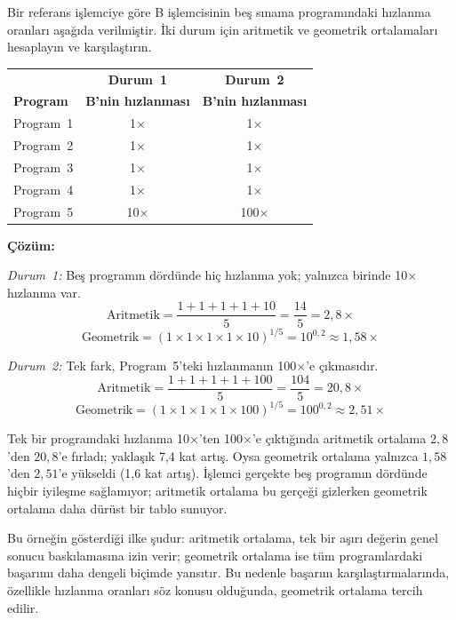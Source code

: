 \begin{ornek}[2.7]
Bir referans işlemciye göre B işlemcisinin beş sınama programındaki hızlanma oranları aşağıda verilmiştir. İki durum için aritmetik ve geometrik ortalamaları hesaplayın ve karşılaştırın.

\begin{center}
\small
\begin{tabular}{lcc}
\toprule
 & \textbf{Durum~1} & \textbf{Durum~2} \\
\textbf{Program} & \textbf{B'nin hızlanması} & \textbf{B'nin hızlanması} \\
\midrule
Program~1 & 1$\times$ & 1$\times$ \\
Program~2 & 1$\times$ & 1$\times$ \\
Program~3 & 1$\times$ & 1$\times$ \\
Program~4 & 1$\times$ & 1$\times$ \\
Program~5 & 10$\times$ & 100$\times$ \\
\bottomrule
\end{tabular}
\end{center}

\textbf{Çözüm:}

\emph{Durum~1:} Beş programın dördünde hiç hızlanma yok; yalnızca birinde 10$\times$ hızlanma var.
\[
\text{Aritmetik} = \frac{1+1+1+1+10}{5} = \frac{14}{5} = 2{,}8\times
\]
\[
\text{Geometrik} = (1 \times 1 \times 1 \times 1 \times 10)^{1/5} = 10^{0{,}2} \approx 1{,}58\times
\]

\emph{Durum~2:} Tek fark, Program~5'teki hızlanmanın 100$\times$'e çıkmasıdır.
\[
\text{Aritmetik} = \frac{1+1+1+1+100}{5} = \frac{104}{5} = 20{,}8\times
\]
\[
\text{Geometrik} = (1 \times 1 \times 1 \times 1 \times 100)^{1/5} = 100^{0{,}2} \approx 2{,}51\times
\]

Tek bir programdaki hızlanma 10$\times$'ten 100$\times$'e çıktığında aritmetik ortalama $2{,}8$'den $20{,}8$'e fırladı; yaklaşık 7,4 kat artış. Oysa geometrik ortalama yalnızca $1{,}58$'den $2{,}51$'e yükseldi (1,6 kat artış). İşlemci gerçekte beş programın dördünde hiçbir iyileşme sağlamıyor; aritmetik ortalama bu gerçeği gizlerken geometrik ortalama daha dürüst bir tablo sunuyor.
\end{ornek}

Bu örneğin gösterdiği ilke şudur: aritmetik ortalama, tek bir aşırı değerin genel sonucu baskılamasına izin verir; geometrik ortalama ise tüm programlardaki başarımı daha dengeli biçimde yansıtır. Bu nedenle başarım karşılaştırmalarında, özellikle hızlanma oranları söz konusu olduğunda, geometrik ortalama tercih edilir.

